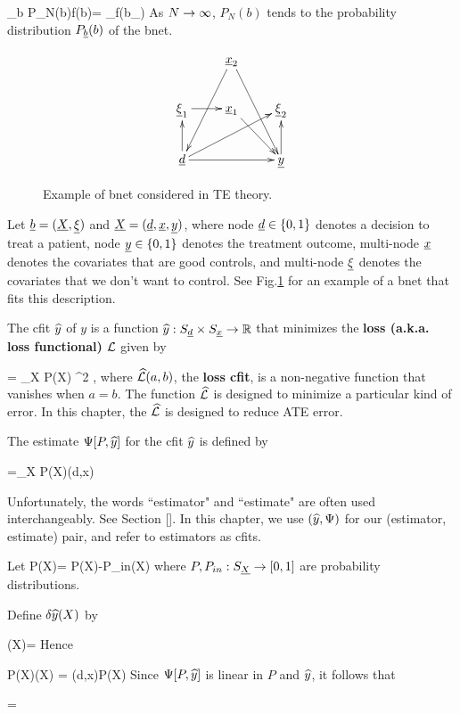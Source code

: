 \beq
\sum_b P_N(b)f(b)=
\sum_\s f(b_\s)
\eeq
As $N\rightarrow \infty$, $P_N(b)$ tends
to the probability distribution $P_{\underline{b}}(b)$
of the bnet.
\begin{figure}[h!]
$$
\xymatrix{
&\rvx_2\ar[ddl]\ar[ddr]
\\
\ul{\xi}_1\ar[r]
&\rvx_1\ar[dr]
&\ul{\xi}_2
\\
\rvd\ar[rr]\ar[u]\ar[rru]
&
&\rvy\ar[u]
}
$$
\caption{Example of bnet considered in TE
theory.}
\label{fig-targeted-bnet}
\end{figure}

Let ${\underline{b}}=({\underline{X}}, \underline{\xi})$ and
${\underline{X}}=({\underline{d}}, {\underline{x}},{\underline{y}})$,
where
node ${\underline{d}}\in\{0,1\}$ denotes a decision to treat a patient,
node ${\underline{y}}\in \{0,1\}$ denotes the treatment outcome,
multi-node ${\underline{x}}$ denotes the covariates
that are good controls, and multi-node $\underline{\xi}$ denotes
the covariates that we don't want to control.
See Fig.\ref{fig-targeted-bnet}
for an example of a bnet that fits this description.


The cfit ${\widehat{y}}$ of $y$
is a function ${\widehat{y}}:S_{\underline{d}}\times S_{\underline{x}}\rightarrow { \mathbb{R}}$
that minimizes the {\bf loss (a.k.a. loss functional)} ${\cal L}$
given by


\beq
\call[P, \haty]= \sum_X P(X) \hatl[y, \haty(d,x)]^2
\;,
\eeq
where $\widehat{{\cal L}}(a,b)$, the {\bf loss
cfit}, is a
non-negative function
that vanishes when $a=b$.
The function $\widehat{{\cal L}}$ is designed
to minimize a particular kind of error.
In this chapter, the $\widehat{{\cal L}}$
is designed to reduce ATE error.


The estimate
 $\Psi[P, {\widehat{y}}]$ for the cfit ${\widehat{y}}$
is defined by

\beq
\Psi[P, \haty] =\sum_X P(X)\haty(d,x)
\eeq

Unfortunately, the words ``estimator"
and ``estimate" are often used
interchangeably. See Section
[].
In this chapter, we use $({\widehat{y}}, \Psi)$
for our (estimator, estimate) pair,
and refer to estimators as cfits.


Let
\beq
\delta P(X)=
P(X)-P_{in}(X)
\eeq
where $P, P_{in}:S_{\underline{X}}\rightarrow [0,1]$ are
probability distributions.

Define $\delta{\widehat{y}}(X)$ by

\beq
\delta\haty(X)= 
\eeq
Hence

\beq
P(X)\delta\haty(X) = \haty(d,x)\delta P(X)
\eeq
Since $\Psi[P, {\widehat{y}}]$
is linear in $P$ and ${\widehat{y}}$,
it follows that

\beq
{}=
\eeq


